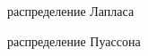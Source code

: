 \documentclass[a4paper]{article}
\begin{document}
\begin{figure}[H]
\label{fig:laplace}
\caption{распределение Лапласа}
\end{figure}

\begin{figure}[H]
\label{fig:poisson}
\caption{распределение Пуассона}
\end{figure}
\end{document}
